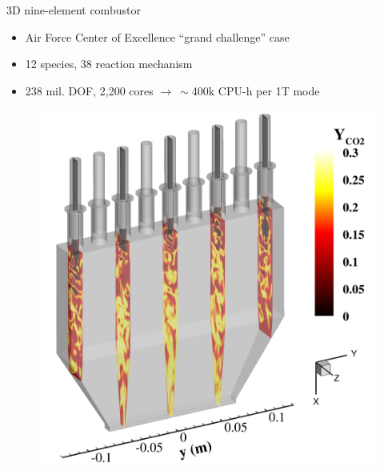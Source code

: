 \documentclass[]{beamer}
\begin{document}
\begin{frame}{3D nine-element combustor}
	\begin{itemize}
		\item Air Force Center of Excellence ``grand challenge'' case\footnotemark[14]
		\item 12 species, 38 reaction mechanism 
		\item 238 mil. DOF, 2,200 cores $\rightarrow ~\sim$400k CPU-h per 1T mode
	\end{itemize}
	\begin{figure}
		\begin{minipage}{0.45\linewidth}
			\includegraphics[width=0.99\linewidth]{Images/experiments/9elem/geom_iso.png}
		\end{minipage}
		\begin{minipage}{0.45\linewidth}
		\end{minipage}
	\end{figure}
\end{frame}
\end{document}
